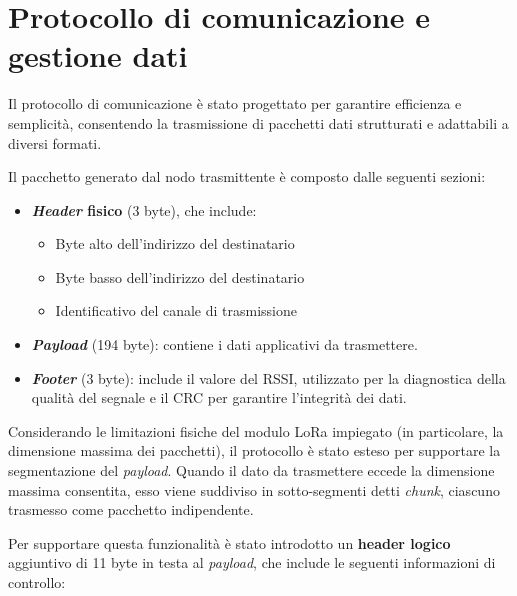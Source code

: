 \documentclass[12pt,a4paper,twoside]{book}
\begin{document}
\newpage
\section{Protocollo di comunicazione e gestione dati}

Il protocollo di comunicazione è stato progettato per garantire efficienza e
semplicità, consentendo la trasmissione di pacchetti dati strutturati e adattabili
a diversi formati.

Il pacchetto generato dal nodo trasmittente è composto dalle seguenti sezioni:

\begin{itemize}
    \item \textbf{\emph{Header} fisico} (3 byte), che include:
          \begin{itemize}
              \item Byte alto dell’indirizzo del destinatario
              \item Byte basso dell’indirizzo del destinatario
              \item Identificativo del canale di trasmissione
          \end{itemize}
    \item \textbf{\emph{Payload}} (194 byte): contiene i dati applicativi da trasmettere.

    \item \textbf{\emph{Footer}} (3 byte): include il valore del \ac{RSSI},
          utilizzato per la diagnostica della qualità del segnale e il \ac{CRC} per
          garantire l'integrità dei dati.
\end{itemize}

Considerando le limitazioni fisiche del modulo \ac{LoRa} impiegato (in particolare,
la dimensione massima dei pacchetti), il protocollo è stato esteso per supportare
la segmentazione del \emph{payload}. Quando il dato da trasmettere eccede la dimensione
massima consentita, esso viene suddiviso in sotto-segmenti detti \emph{chunk},
ciascuno trasmesso come pacchetto indipendente.

Per supportare questa funzionalità è stato introdotto un \textbf{header logico}
aggiuntivo di 11 byte in testa al \emph{payload}, che include le seguenti informazioni di controllo:
\end{document}
